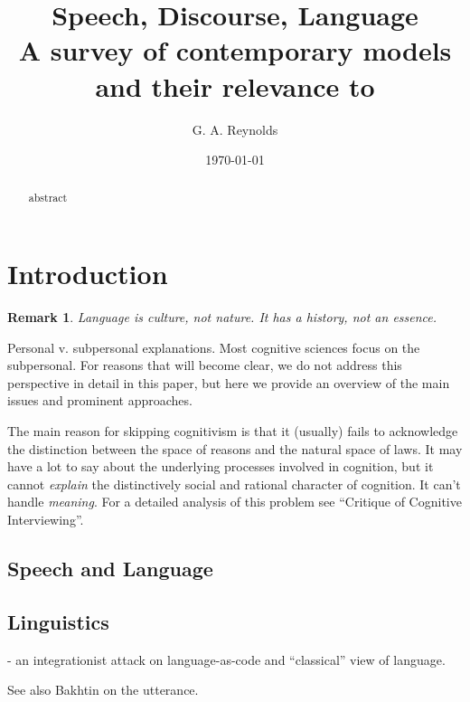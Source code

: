 \documentclass[11pt,twoside]{article}
\title{Speech, Discourse, Language \\
\vspace{12pt} \Large{A survey of contemporary models and their relevance to \\
\SR{}}}
\author{G. A. Reynolds}
\date{\today}
\newtheorem{remark}{Remark}
\begin{document}
\maketitle
\nocite{*}

\begin{abstract}
abstract
\end{abstract}

\tableofcontents
\listoffigures

\newpage
\section{Introduction}

\begin{abstract}

\end{abstract}

\begin{remark}
  Language is culture, not nature.  It has a history, not an essence.
\end{remark}

Personal v. subpersonal explanations.  Most cognitive sciences focus
on the subpersonal.  For reasons that will become clear, we do not
address this perspective in detail in this paper, but here we provide
an overview of the main issues and prominent approaches.

The main reason for skipping cognitivism is that it (usually) fails to
acknowledge the distinction between the space of reasons and the
natural space of laws.  It may have a lot to say about the underlying
processes involved in cognition, but it cannot \textit{explain} the
distinctively social and rational character of cognition.  It can't
handle \textit{meaning}.  For a detailed analysis of this problem see
``Critique of Cognitive Interviewing''.

\subsection{Speech and Language}

\subsection{Linguistics}

\cite{love_cognition_2004} - an integrationist attack on
language-as-code and ``classical'' view of language.

See also Bakhtin on the utterance.
\end{document}
